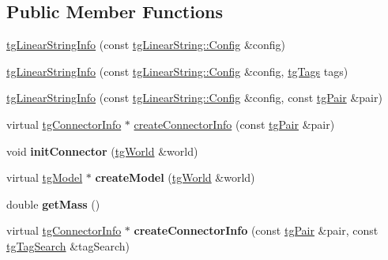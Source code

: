 \subsection*{Public Member Functions}
\begin{DoxyCompactItemize}
\item 
\hyperlink{classtg_linear_string_info_a381275e0a78c1816c46372efefa2dd6d}{tg\-Linear\-String\-Info} (const \hyperlink{structtg_base_string_1_1_config}{tg\-Linear\-String\-::\-Config} \&config)
\item 
\hyperlink{classtg_linear_string_info_adfe55ab47e4649352b9f45697a907bea}{tg\-Linear\-String\-Info} (const \hyperlink{structtg_base_string_1_1_config}{tg\-Linear\-String\-::\-Config} \&config, \hyperlink{classtg_tags}{tg\-Tags} tags)
\item 
\hyperlink{classtg_linear_string_info_a22f715aabc4a2413e34bea9ef9f7465b}{tg\-Linear\-String\-Info} (const \hyperlink{structtg_base_string_1_1_config}{tg\-Linear\-String\-::\-Config} \&config, const \hyperlink{classtg_pair}{tg\-Pair} \&pair)
\item 
virtual \hyperlink{classtg_connector_info}{tg\-Connector\-Info} $\ast$ \hyperlink{classtg_linear_string_info_abef8bc23564af3909b1967c97e2f1567}{create\-Connector\-Info} (const \hyperlink{classtg_pair}{tg\-Pair} \&pair)
\item 
\hypertarget{classtg_linear_string_info_ae7286c539de8be1164a2b083c7033ba8}{void {\bfseries init\-Connector} (\hyperlink{classtg_world}{tg\-World} \&world)}\label{classtg_linear_string_info_ae7286c539de8be1164a2b083c7033ba8}

\item 
\hypertarget{classtg_linear_string_info_aacd71b70c911f740c39a546584ba702d}{virtual \hyperlink{classtg_model}{tg\-Model} $\ast$ {\bfseries create\-Model} (\hyperlink{classtg_world}{tg\-World} \&world)}\label{classtg_linear_string_info_aacd71b70c911f740c39a546584ba702d}

\item 
\hypertarget{classtg_linear_string_info_adc9084c3903f61054aaf88191c4c49eb}{double {\bfseries get\-Mass} ()}\label{classtg_linear_string_info_adc9084c3903f61054aaf88191c4c49eb}

\item 
\hypertarget{classtg_connector_info_a4442bb9d3c65ad34ae6503fbfb02b411}{virtual \hyperlink{classtg_connector_info}{tg\-Connector\-Info} $\ast$ {\bfseries create\-Connector\-Info} (const \hyperlink{classtg_pair}{tg\-Pair} \&pair, const \hyperlink{classtg_tag_search}{tg\-Tag\-Search} \&tag\-Search)}\label{classtg_connector_info_a4442bb9d3c65ad34ae6503fbfb02b411}


\end{DoxyCompactItemize}
